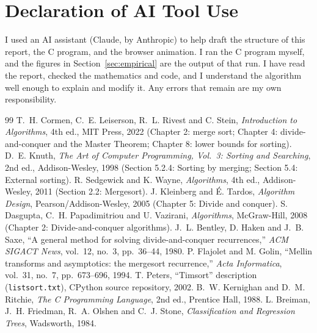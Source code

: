 \documentclass[11pt,a4paper]{article}
\theoremstyle{plain}
\theoremstyle{definition}
\begin{document}
\section*{Declaration of AI Tool Use}
I used an AI assistant (Claude, by Anthropic) to help draft the structure of this report, the C program, and the browser animation. I ran the C program myself, and the figures in Section~\ref{sec:empirical} are the output of that run. I have read the report, checked the mathematics and code, and I understand the algorithm well enough to explain and modify it. Any errors that remain are my own responsibility.

\begin{thebibliography}{99}\small
\setlength{\itemsep}{2pt}
 T.~H. Cormen, C.~E. Leiserson, R.~L. Rivest and C. Stein, \emph{Introduction to Algorithms}, 4th ed., MIT Press, 2022 (Chapter 2: merge sort; Chapter 4: divide-and-conquer and the Master Theorem; Chapter 8: lower bounds for sorting).
 D.~E. Knuth, \emph{The Art of Computer Programming, Vol.~3: Sorting and Searching}, 2nd ed., Addison-Wesley, 1998 (Section 5.2.4: Sorting by merging; Section 5.4: External sorting).
 R. Sedgewick and K. Wayne, \emph{Algorithms}, 4th ed., Addison-Wesley, 2011 (Section 2.2: Mergesort).
 J. Kleinberg and \'E. Tardos, \emph{Algorithm Design}, Pearson/Addison-Wesley, 2005 (Chapter 5: Divide and conquer).
 S. Dasgupta, C.~H. Papadimitriou and U. Vazirani, \emph{Algorithms}, McGraw-Hill, 2008 (Chapter 2: Divide-and-conquer algorithms).
 J.~L. Bentley, D. Haken and J.~B. Saxe, ``A general method for solving divide-and-conquer recurrences,'' \emph{ACM SIGACT News}, vol.~12, no.~3, pp.~36--44, 1980.
 P. Flajolet and M. Golin, ``Mellin transforms and asymptotics: the mergesort recurrence,'' \emph{Acta Informatica}, vol.~31, no.~7, pp.~673--696, 1994.
 T. Peters, ``Timsort'' description (\texttt{listsort.txt}), CPython source repository, 2002.
 B.~W. Kernighan and D.~M. Ritchie, \emph{The C Programming Language}, 2nd ed., Prentice Hall, 1988.
 L. Breiman, J.~H. Friedman, R.~A. Olshen and C.~J. Stone, \emph{Classification and Regression Trees}, Wadsworth, 1984.
\end{thebibliography}
\end{document}
